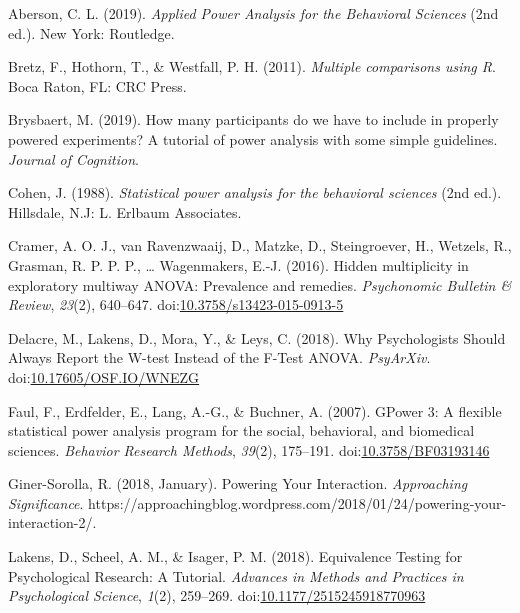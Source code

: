 \documentclass[
  ,jou,floatsintext]{apa6}
\begin{document}
\hypertarget{refs}{}
\leavevmode\hypertarget{ref-aberson_applied_2019}{}%
Aberson, C. L. (2019). \emph{Applied Power Analysis for the Behavioral Sciences} (2nd ed.). New York: Routledge.

\leavevmode\hypertarget{ref-bretz_multiple_2011}{}%
Bretz, F., Hothorn, T., \& Westfall, P. H. (2011). \emph{Multiple comparisons using R}. Boca Raton, FL: CRC Press.

\leavevmode\hypertarget{ref-brysbaert_how_2019}{}%
Brysbaert, M. (2019). How many participants do we have to include in properly powered experiments? A tutorial of power analysis with some simple guidelines. \emph{Journal of Cognition}.

\leavevmode\hypertarget{ref-cohen_statistical_1988}{}%
Cohen, J. (1988). \emph{Statistical power analysis for the behavioral sciences} (2nd ed.). Hillsdale, N.J: L. Erlbaum Associates.

\leavevmode\hypertarget{ref-cramer_hidden_2016}{}%
Cramer, A. O. J., van Ravenzwaaij, D., Matzke, D., Steingroever, H., Wetzels, R., Grasman, R. P. P. P., \ldots{} Wagenmakers, E.-J. (2016). Hidden multiplicity in exploratory multiway ANOVA: Prevalence and remedies. \emph{Psychonomic Bulletin \& Review}, \emph{23}(2), 640--647. doi:\href{https://doi.org/10.3758/s13423-015-0913-5}{10.3758/s13423-015-0913-5}

\leavevmode\hypertarget{ref-delacre_why_2018}{}%
Delacre, M., Lakens, D., Mora, Y., \& Leys, C. (2018). Why Psychologists Should Always Report the W-test Instead of the F-Test ANOVA. \emph{PsyArXiv}. doi:\href{https://doi.org/10.17605/OSF.IO/WNEZG}{10.17605/OSF.IO/WNEZG}

\leavevmode\hypertarget{ref-faul_gpower_2007}{}%
Faul, F., Erdfelder, E., Lang, A.-G., \& Buchner, A. (2007). GPower 3: A flexible statistical power analysis program for the social, behavioral, and biomedical sciences. \emph{Behavior Research Methods}, \emph{39}(2), 175--191. doi:\href{https://doi.org/10.3758/BF03193146}{10.3758/BF03193146}

\leavevmode\hypertarget{ref-giner-sorolla_powering_2018}{}%
Giner-Sorolla, R. (2018, January). Powering Your Interaction. \emph{Approaching Significance}. https://approachingblog.wordpress.com/2018/01/24/powering-your-interaction-2/.

\leavevmode\hypertarget{ref-lakens_equivalence_2018}{}%
Lakens, D., Scheel, A. M., \& Isager, P. M. (2018). Equivalence Testing for Psychological Research: A Tutorial. \emph{Advances in Methods and Practices in Psychological Science}, \emph{1}(2), 259--269. doi:\href{https://doi.org/10.1177/2515245918770963}{10.1177/2515245918770963}
\end{document}
